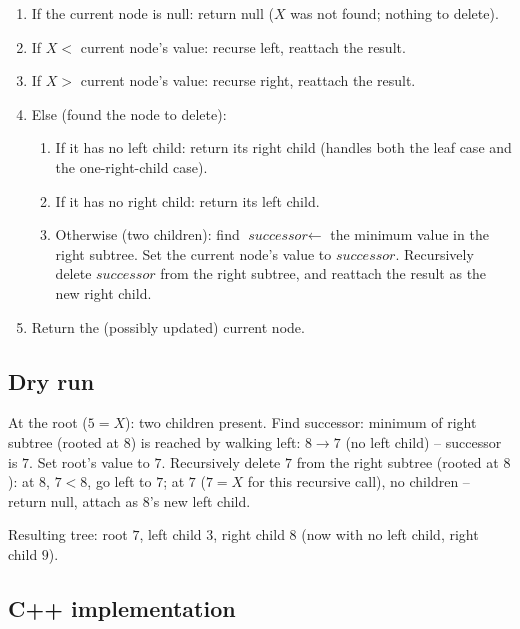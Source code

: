 \begin{enumerate}
  \item If the current node is null: return null ($X$ was not found;
        nothing to delete).
  \item If $X <$ current node's value: recurse left, reattach the
        result.
  \item If $X >$ current node's value: recurse right, reattach the
        result.
  \item Else (found the node to delete):
  \begin{enumerate}
    \item If it has no left child: return its right child (handles both
          the leaf case and the one-right-child case).
    \item If it has no right child: return its left child.
    \item Otherwise (two children): find $\textit{successor} \gets$ the
          minimum value in the right subtree. Set the current node's
          value to $\textit{successor}$. Recursively delete
          $\textit{successor}$ from the right subtree, and reattach the
          result as the new right child.
  \end{enumerate}
  \item Return the (possibly updated) current node.
\end{enumerate}

\subsection*{Dry run}


At the root ($5=X$): two children present. Find successor: minimum of
right subtree (rooted at $8$) is reached by walking left: $8 \to 7$ (no
left child) -- successor is $7$. Set root's value to $7$. Recursively
delete $7$ from the right subtree (rooted at $8$): at $8$, $7<8$, go
left to $7$; at $7$ ($7=X$ for this recursive call), no children --
return null, attach as $8$'s new left child.

Resulting tree: root $7$, left child $3$, right child $8$ (now with no
left child, right child $9$).

\subsection*{C++ implementation}

